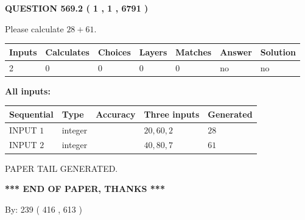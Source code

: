 \documentclass[12pt]{article}
\begin{document}
\vspace{0.2in}
  
{\textbf{\Large{QUESTION
569.2 
 ( 1 , 1 , 6791 )
}}}
  
  
 
Please calculate $ %
28 +  %
61 $.
 
 
   
   
   
   
\noindent\begin{tabular}{|l|l|l|l|l|l|l|}
 \hline
Inputs & Calculates & Choices & Layers & Matches & Answer & Solution \\ \hline
 2  & 
 0  & 
 0
  & 
 0  & 
 0  & 
  no & 
  no 
  \\ \hline
 \end{tabular}
   
   
   
   
\noindent{}
   
   
   
   
\noindent\vspace{0.1in}\hspace{-0.08in} {\textbf{\Large{All inputs: }}}
   
   
  
  
\noindent\begin{tabular}{|l|l|l|l|l|}
\hline
 Sequential & Type & Accuracy & Three inputs & Generated \\ 
\hline
 
 
  INPUT $  1 $ & integer &  & $
 20
 , 
 60
 , 
 2
 $ & $ 28 $ 
 \\  \hline  
 
 
  INPUT $  2 $ & integer &  & $
 40
 , 
 80
 , 
 7
 $ & $ 61 $ 
 \\  \hline  
 \end{tabular}
   
   
   
   
   
   
 \vspace{0.2in}
 
   
   
\vspace{2.0in} PAPER TAIL GENERATED.
   
   
   
   
\vspace{1.0in} 
{\textbf{\large{ *** END OF PAPER, THANKS *** }}} 
   
   
\hspace{1.0in} By: 
 239 ( 416 ,  613 )
   
\end{document}
